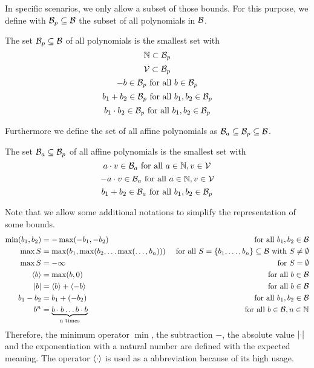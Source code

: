 In specific scenarios, we only allow a subset of those bounds.
For this purpose, we define with $\mathcal{B}_p \subseteq \mathcal{B}$ the subset of all polynomials in $\mathcal{B}$.
\begin{definition}
  The set $\mathcal{B}_p \subseteq \mathcal{B}$ of all polynomials is the smallest set with
  \[ \mathbb{N} \subset \mathcal{B}_p \] 
  \[ \mathcal{V} \subset \mathcal{B}_p \] 
  \[ -b \in \mathcal{B}_p \text{ for all } b \in \mathcal{B}_p \] 
  \[ b_1 + b_2 \in \mathcal{B}_p \text{ for all } b_1, b_2 \in \mathcal{B}_p \] 
  \[ b_1 \cdot b_2 \in \mathcal{B}_p \text{ for all } b_1, b_2 \in \mathcal{B}_p \] 
\end{definition}
Furthermore we define the set of all affine polynomials as $\mathcal{B}_a \subseteq \mathcal{B}_p \subseteq \mathcal{B}$. 
\begin{definition}
  The set $\mathcal{B}_a \subseteq \mathcal{B}_p$ of all affine polynomials is the smallest set with
  \[ a \cdot v \in \mathcal{B}_a \text{ for all } a \in \mathbb{N}, v \in \mathcal{V} \] 
  \[ -a \cdot v \in \mathcal{B}_a \text{ for all } a \in \mathbb{N}, v \in \mathcal{V} \] 
  \[ b_1 + b_2 \in \mathcal{B}_a \text{ for all } b_1, b_2 \in \mathcal{B}_p \] 
\end{definition}
Note that we allow some additional notations to simplify the representation of some bounds.
\begin{align*}
  \min(b_1,b_2) &= -\max(-b_1,-b_2) & \text{ for all } b_1, b_2 \in \mathcal{B} \\
  \max S &= \max(b_1, \max(b_2, \dots \max(\dots, b_n))) & \text{ for all } S = \lbrace b_1, \dots, b_n \rbrace \subseteq \mathcal{B} \text{ with } S \neq \emptyset \\
  \max S &= -\infty & \text{ for } S = \emptyset \\
  \langle b\rangle &= \max(b,0) & \text{ for all } b \in \mathcal{B} \\
  \left|b\right| &= \langle b\rangle + \langle-b\rangle & \text{ for all } b \in \mathcal{B} \\
  b_1 - b_2 &= b_1 + (-b_2) & \text{ for all } b_1, b_2 \in \mathcal{B} \\
  b^n &= \underbrace{b \cdot b \dots b \cdot b}_\text{n times} & \text{ for all } b \in \mathcal{B}, n \in \mathbb{N}
\end{align*}
Therefore, the minimum operator $\min$, the subtraction $-$, the absolute value $\left|\cdot\right|$ and the exponentiation with a natural number are defined with the expected meaning.
The operator $\langle\cdot\rangle$ is used as a abbreviation because of its high usage.


